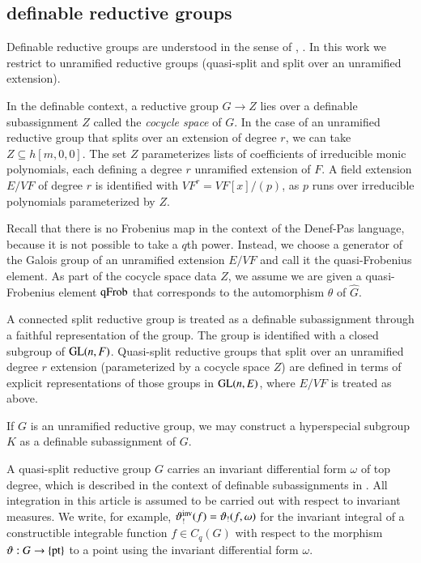 \subsection{definable reductive groups}

Definable reductive groups are understood in the sense of \cite{cluckers2011transfer}, \cite{gordon}.
In this work we restrict to unramified reductive groups (quasi-split and split over an unramified extension).

In the definable context, a reductive group $G\to Z$ lies over a definable subassignment
$Z$ called the {\it cocycle space} of $G$.  In the case of an unramified reductive group that splits over an extension of degree $r$, 
we can take $Z\subseteq h[m,0,0]$.  
The set $Z$ parameterizes lists of coefficients of irreducible monic 
polynomials, each  defining a degree $r$ unramified extension of $F$.  A field extension $E/VF$ of degree $r$ is identified
with $VF^r = VF[x]/(p)$, as $p$ runs over irreducible polynomials parameterized by $Z$.


Recall that there is no Frobenius map in the context of the Denef-Pas language, because it is not possible to take a $q$th power.
Instead, we choose a generator of the Galois group of an unramified extension $E/VF$ and call it the quasi-Frobenius element.
As part of the cocycle space data $Z$, we assume we are given a quasi-Frobenius element ${\operatorname{qFrob}}$ that corresponds
to the automorphism $\theta$ of $\hat G$.  


A connected split reductive group is treated as a definable subassignment through a faithful representation of the group.
The group is identified with a closed subgroup of ${\operatorname{GL}}(n,F)$.  Quasi-split reductive groups that split over an unramified degree $r$
extension (parameterized by a cocycle space $Z$) are defined in terms of explicit representations of those groups
in ${\operatorname{GL}}(n,E)$, where $E/VF$ is treated as above.

If $G$ is an unramified reductive group, we may construct a hyperspecial subgroup $K$ as a definable subassignment of $G$.

A quasi-split reductive group $G$ carries an invariant differential form $\omega$ of top degree, which is described in the
context of definable subassignments in \cite{gordon}.
All integration in this article is assumed to be carried out with respect to invariant measures.  We write, for example,
$\vartheta_!^{\operatorname{inv}}(f) = \vartheta_!(f,\omega)$ for the invariant integral of a constructible integrable function $f\in C_q(G)$ with respect to the
morphism $\vartheta:G\to\{{\operatorname{pt}}\}$ to a point using the invariant differential form $\omega$.

